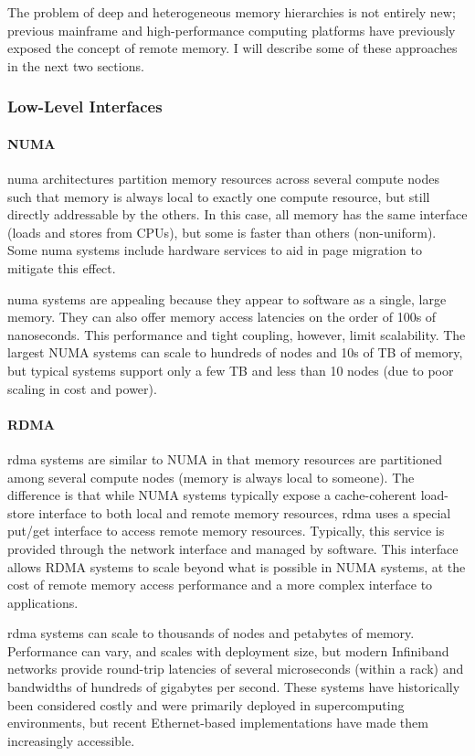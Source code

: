 The problem of deep and heterogeneous memory hierarchies is not entirely new;
previous mainframe and high-performance computing platforms have previously
exposed the concept of remote memory. I will describe some of these approaches
in the next two sections.

\subsubsection{Low-Level Interfaces}
\paragraph{NUMA}
\Gls{numa} architectures partition memory resources across several compute
nodes such that memory is always local to exactly one compute resource, but
still directly addressable by the others. In this case, all memory has the same
interface (loads and stores from CPUs), but some is faster than others
(non-uniform). Some \gls{numa} systems include hardware services to aid in page
migration to mitigate this effect\cite{sgi_origin}.

\Gls{numa} systems are appealing because they appear to software as a single,
large memory. They can also offer memory access latencies on the order of 100s
of nanoseconds. This performance and tight coupling, however, limit
scalability. The largest NUMA systems can scale to hundreds of nodes and 10s of
TB of memory\cite{sgiUV}, but typical systems support only a few TB and less
than 10 nodes (due to poor scaling in cost and power).

\paragraph{RDMA}
\Gls{rdma} systems are similar to NUMA in that memory resources are partitioned
among several compute nodes (memory is always local to
someone)\cite{RoCE}\cite{RFC5040}. The difference is that while NUMA systems
typically expose a cache-coherent load-store interface to both local and remote
memory resources, \gls{rdma} uses a special put/get interface to access remote
memory resources. Typically, this service is provided through the network
interface and managed by software. This interface allows RDMA systems to scale
beyond what is possible in NUMA systems, at the cost of remote memory access
performance and a more complex interface to applications.

\Gls{rdma} systems can scale to thousands of nodes and petabytes of
memory\cite{IB_ref_design}. Performance can vary, and scales with deployment
size, but modern Infiniband networks provide round-trip latencies of several
microseconds (within a rack) and bandwidths of hundreds of gigabytes per
second\cite{ib_perf}. These systems have historically been considered costly
and were primarily deployed in supercomputing environments, but recent
Ethernet-based implementations have made them increasingly
accessible\cite{RoCE}.
 
